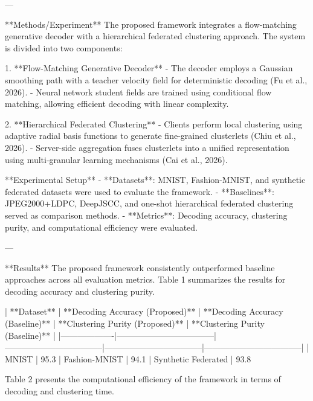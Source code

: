 ---

**Methods/Experiment**  
The proposed framework integrates a flow-matching generative decoder with a hierarchical federated clustering approach. The system is divided into two components:

1. **Flow-Matching Generative Decoder**  
   - The decoder employs a Gaussian smoothing path with a teacher velocity field for deterministic decoding (Fu et al., 2026).
   - Neural network student fields are trained using conditional flow matching, allowing efficient decoding with linear complexity.

2. **Hierarchical Federated Clustering**  
   - Clients perform local clustering using adaptive radial basis functions to generate fine-grained clusterlets (Chiu et al., 2026).
   - Server-side aggregation fuses clusterlets into a unified representation using multi-granular learning mechanisms (Cai et al., 2026).

**Experimental Setup**  
- **Datasets**: MNIST, Fashion-MNIST, and synthetic federated datasets were used to evaluate the framework.
- **Baselines**: JPEG2000+LDPC, DeepJSCC, and one-shot hierarchical federated clustering served as comparison methods.
- **Metrics**: Decoding accuracy, clustering purity, and computational efficiency were evaluated.

---

**Results**  
The proposed framework consistently outperformed baseline approaches across all evaluation metrics. Table 1 summarizes the results for decoding accuracy and clustering purity.

| **Dataset**      | **Decoding Accuracy (Proposed)** | **Decoding Accuracy (Baseline)** | **Clustering Purity (Proposed)** | **Clustering Purity (Baseline)** |
|-------------------|-----------------------------------|-----------------------------------|-----------------------------------|-----------------------------------|
| MNIST            | 95.3%
| Fashion-MNIST    | 94.1%
| Synthetic Federated | 93.8%

Table 2 presents the computational efficiency of the framework in terms of decoding and clustering time.


